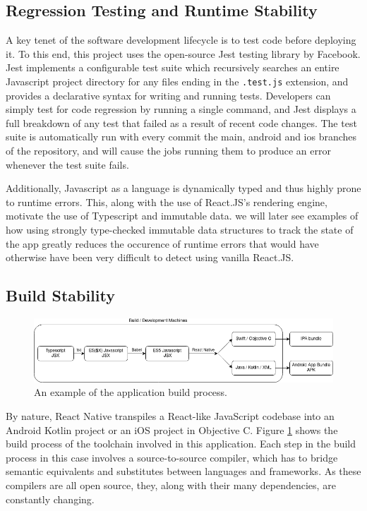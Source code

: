 \subsection{Regression Testing and Runtime Stability}
A key tenet of the software development lifecycle is to test code before deploying it. To this end, this project uses the open-source Jest testing library by Facebook. Jest implements a configurable test suite which recursively searches an entire Javascript project directory for any files ending in the \texttt{.test.js} extension, and provides a declarative syntax for writing and running tests. Developers can simply test for code regression by running a single command, and Jest displays a full breakdown of any test that failed as a result of recent code changes. The test suite is automatically run with every commit the main, android and ios branches of the repository, and will cause the jobs running them to produce an error whenever the test suite fails.

Additionally, Javascript as a language is dynamically typed and thus highly prone to runtime errors. This, along with the use of React.JS's rendering engine, motivate the use of Typescript and immutable data. we will later see examples of how using strongly type-checked immutable data structures to track the state of the app greatly reduces the occurence of runtime errors that would have otherwise have been very difficult to detect using vanilla React.JS.

\subsection{Build Stability}

\begin{figure}[h]
    \begin{center}
        \includegraphics[scale=0.55]{images/app_build_path.png}
    \end{center}
    \caption{An example of the application build process.}
    \label{fig:app_build_process}
\end{figure}

By nature, React Native transpiles a React-like JavaScript codebase into an Android Kotlin project or an iOS project in Objective C. Figure \ref{fig:app_build_process} shows the build process of the toolchain involved in this application. Each step in the build process in this case involves a source-to-source compiler, which has to bridge semantic equivalents and substitutes between languages and frameworks. As these compilers are all open source, they, along with their many dependencies, are constantly changing.

